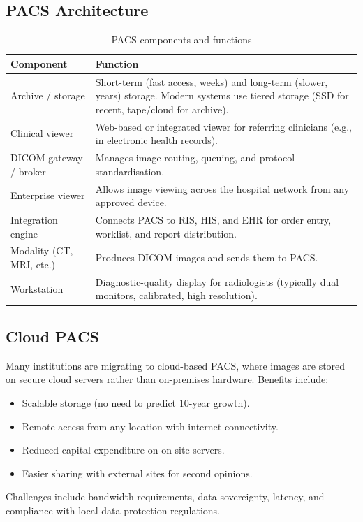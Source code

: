 \subsection*{PACS Architecture}

\begin{table}[h]
\centering
\caption{PACS components and functions}
\begin{tabular}{|l|p{8cm}|}
\hline
\textbf{Component} & \textbf{Function} \\
\hline
Archive / storage & Short-term (fast access, weeks) and long-term (slower, years) storage. Modern systems use tiered storage (SSD for recent, tape/cloud for archive). \\
\hline
Clinical viewer & Web-based or integrated viewer for referring clinicians (e.g., in electronic health records). \\
\hline
DICOM gateway / broker & Manages image routing, queuing, and protocol standardisation. \\
\hline
Enterprise viewer & Allows image viewing across the hospital network from any approved device. \\
\hline
Integration engine & Connects PACS to RIS, HIS, and EHR for order entry, worklist, and report distribution. \\
\hline
Modality (CT, MRI, etc.) & Produces DICOM images and sends them to PACS. \\
\hline
Workstation & Diagnostic-quality display for radiologists (typically dual monitors, calibrated, high resolution). \\
\hline
\end{tabular}
\end{table}

\subsection*{Cloud PACS}
Many institutions are migrating to cloud-based PACS, where images are stored on secure cloud servers rather than on-premises hardware. Benefits include:
\begin{itemize}
    \item Scalable storage (no need to predict 10-year growth).
    \item Remote access from any location with internet connectivity.
    \item Reduced capital expenditure on on-site servers.
    \item Easier sharing with external sites for second opinions.
\end{itemize}
Challenges include bandwidth requirements, data sovereignty, latency, and compliance with local data protection regulations.


